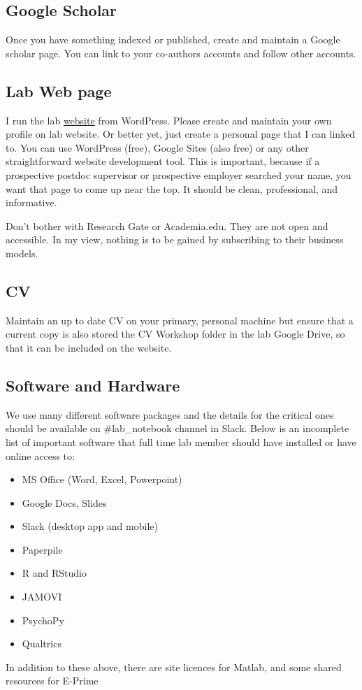 \documentclass{article}
\begin{document}
\subsection{Google Scholar}
Once you have something indexed or published, create and maintain a Google scholar page. You can link to your co-authors accounts and follow other accounts.

\subsection{Lab Web page}
I run the lab \href{http://mindalab.worpress.com}{website} from WordPress. Please create and maintain your own profile on lab website. Or better yet, just create a personal page that I can linked to. You can use WordPress (free), Google Sites (also free) or any other straightforward website development tool. This is important, because if a prospective postdoc supervisor or prospective employer searched your name, you want that page to come up near the top. It should be clean, professional, and informative.

Don't bother with Research Gate or Academia.edu. They are not open and accessible. In my view, nothing is to be gained by subscribing to their business models.

\subsection{CV}
Maintain an up to date CV on your primary, personal machine but ensure that a current copy is also stored the CV Workshop folder in the lab Google Drive, so that it can be included on the website. 





\subsection{Software and Hardware}
We use many different software packages and the details for the critical ones should be available on \#lab\_notebook channel in Slack. Below is an incomplete list of important software that full time lab member should have installed or have online access to:
\begin{itemize}
\item MS Office (Word, Excel, Powerpoint)
\item Google Docs, Slides
\item Slack (desktop app and mobile)
\item Paperpile
\item R and RStudio
\item JAMOVI
\item PsychoPy
\item Qualtrics
\end{itemize}
In addition to these above, there are site licences for Matlab, and some shared resources for E-Prime
\end{document}
